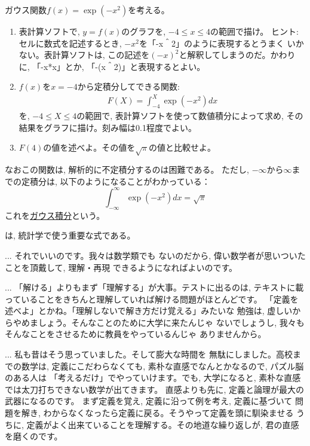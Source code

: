 \begin{exq}\label{q:comp_int4} ガウス関数$f(x)=\exp (-x^2)$を考える。
\begin{enumerate}
\item 表計算ソフトで, $y=f(x)$のグラフを, $-4\leq x\leq 4$の範囲で描け。
ヒント: セルに数式を記述するとき, $-x^2$を「-x＾2」のように表現するとうまく
いかない。表計算ソフトは, この記述を$(-x)^2$と解釈してしまうのだ。かわりに, 
「-x*x」とか, 「-(x＾2)」と表現するとよい。
\item $f(x)$を$x=-4$から定積分してできる関数:
\begin{eqnarray}F(X)=\int_{-4}^{X}\exp(-x^2)dx\end{eqnarray}
を, $-4 \le X \le 4$の範囲で, 表計算ソフトを使って数値積分によって求め, 
その結果をグラフに描け。刻み幅は0.1程度でよい。
\item $F(4)$の値を述べよ。その値を$\sqrt{\pi}$の値と比較せよ。
\end{enumerate}
なおこの関数は, 解析的に不定積分するのは困難である。
ただし, $-\infty$から$\infty$までの定積分は, 以下のようになることがわかっている：
\begin{equation}\int_{-\infty}^{\infty} \exp(-x^2) dx=\sqrt{\pi}
\label{eq:integ_Gauss_func}\end{equation}
これを\underline{ガウス積分}という。
\end{exq}
は, 統計学で使う重要な式である。
\hv



\begin{faq}{\small{} 
... それでいいのです。我々は数学類でも
ないのだから, 偉い数学者が思いついたことを頂戴して, 理解・再現
できるようになればよいのです。

... 「解ける」よりもまず「理解する」が大事。テストに出るのは, 
テキストに載っていることをきちんと理解していれば解ける問題がほとんどです。
「定義を述べよ」とかね。「理解しないで解き方だけ覚える」みたいな
勉強は, 虚しいからやめましょう。そんなことのために大学に来たんじゃ
ないでしょうし, 我々もそんなことをさせるために教員をやっているんじゃ
ありませんから。}\end{faq}\mv

\begin{faq}{\small{}
... 私も昔はそう思っていました。そして膨大な時間を
無駄にしました。高校までの数学は, 定義にこだわらなくても, 
素朴な直感でなんとかなるので, パズル脳のある人は
「考えるだけ」でやっていけます。でも, 大学になると, 
素朴な直感では太刀打ちできない数学が出てきます。
直感よりも先に, 定義と論理が最大の武器になるのです。
まず定義を覚え, 定義に沿って例を考え, 定義に基づいて
問題を解き, わからなくなったら定義に戻る。そうやって定義を頭に馴染ませる
うちに, 定義がよく出来ていることを理解する。その地道な繰り返しが, 
君の直感を磨くのです。}\end{faq}
\mv

